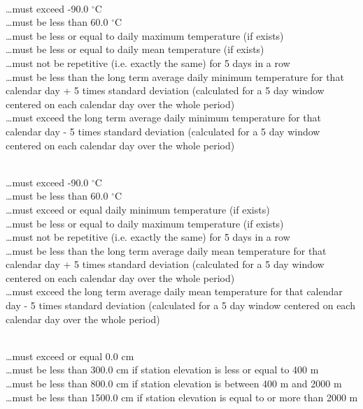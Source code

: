 \documentclass[a4paper,11pt]{article}
\begin{document}
\\
\ldots must exceed -90.0 $^{\circ}$C\\
\ldots must be less than 60.0 $^{\circ}$C\\
\ldots must be less or equal to daily maximum temperature (if exists)\\
\ldots must be less or equal to daily mean temperature (if exists)\\
\ldots must not be repetitive (i.e. exactly the same) for 5 days in a row\\
\ldots must be less than the long term average daily minimum
temperature for that calendar day + 5 times standard deviation
(calculated for a 5 day window centered on each calendar day over the
whole period)\\
\ldots must exceed the long term average daily minimum temperature for
that calendar day - 5 times standard deviation (calculated for a 5 day
window centered on each calendar day over the whole period)
\medskip

\\
\ldots must exceed -90.0 $^{\circ}$C\\
\ldots must be less than 60.0 $^{\circ}$C\\
\ldots must exceed or equal daily minimum temperature (if exists)\\
\ldots must be less or equal to daily maximum temperature (if exists)\\
\ldots must not be repetitive (i.e. exactly the same) for 5 days in a row\\
\ldots must be less than the long term average daily mean temperature
for that calendar day + 5 times standard deviation (calculated for a 5
day window centered on each calendar day over the whole period)\\
\ldots must exceed the long term average daily mean temperature for
that calendar day - 5 times standard deviation (calculated for a 5 day
window centered on each calendar day over the whole period)
\medskip

\\
\ldots must exceed or equal 0.0 cm\\
\ldots must be less than 300.0 cm if station elevation is less or equal to 400 m\\
\ldots must be less than 800.0 cm if station elevation is between 400 m and 2000 m\\
\ldots must be less than 1500.0 cm if station elevation is equal to or more than 2000 m
\medskip
\end{document}
